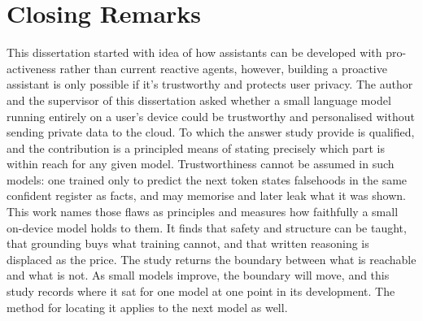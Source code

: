 \section{Closing Remarks}
\label{sec:conclusion-closing}

This dissertation started with idea of how assistants can be developed with pro-activeness rather than current reactive agents, however, building a proactive assistant is only possible if it's trustworthy and protects user privacy. The author and the supervisor of this dissertation asked whether a small language model running entirely on a user's device could be trustworthy and personalised without sending private data to the cloud. To which the answer study provide is qualified, and the contribution is a principled means of stating precisely which part is within reach for any given model. Trustworthiness cannot be assumed in such models: one trained only to predict the next token states falsehoods in the same confident register as facts, and may memorise and later leak what it was shown. This work names those flaws as principles and measures how faithfully a small on-device model holds to them. It finds that safety and structure can be taught, that grounding buys what training cannot, and that written reasoning is displaced as the price. The study returns the boundary between what is reachable and what is not. As small models improve, the boundary will move, and this study records where it sat for one model at one point in its development. The method for locating it applies to the next model as well. 

